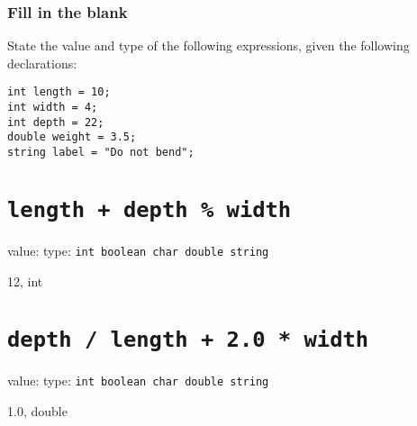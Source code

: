 \documentclass[11pt,answers]{exam}
\begin{document}
\begin{questions}

\newpage

\section*{Fill in the blank}

\question State the value and type of the following expressions, given the following declarations:
\begin{lstlisting}
int length = 10;
int width = 4;
int depth = 22;
double weight = 3.5;
string label = "Do not bend";	
\end{lstlisting}

\begin{parts}
 \part[2] {\tt length + depth \% width } 
    \newline value: \makebox[2in]{\hrulefill} type: {\tt int   boolean   char    double   string} 
	\newline
	\begin{solution} 12, int \end{solution}
		
 \part[2] {\tt depth / length + 2.0 * width}
    \newline value: \makebox[2in]{\hrulefill} type: {\tt int   boolean   char    double   string} 
    \newline
	\begin{solution} 1.0, double \end{solution}
		

\end{parts}
\end{questions}
\end{document}

